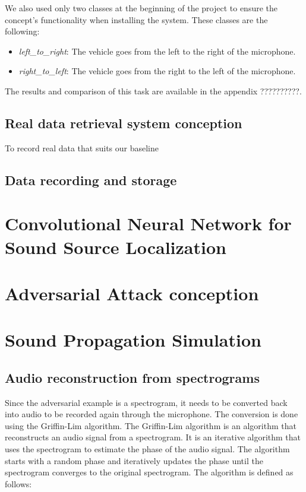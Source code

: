 We also used only two classes at the beginning of the project to ensure the concept's functionality when installing the system. These classes are the following:

\begin{itemize}
    \item  \textit{left\_to\_right}:  The vehicle goes from the left to the right of the microphone.
    \item  \textit{right\_to\_left}:  The vehicle goes from the right to the left of the microphone.
\end{itemize}

The results and comparison of this task are available in the appendix ??????????.

\subsection{Real data retrieval system conception}

To record real data that suits our baseline 

\subsection{Data recording and storage}

\section{Convolutional Neural Network for Sound Source Localization}

\section{Adversarial Attack conception}

\section{Sound Propagation Simulation}





\subsection{Audio reconstruction from spectrograms}

Since the adversarial example is a spectrogram, it needs to be converted back into audio to be recorded again through the microphone. The conversion is done using the Griffin-Lim algorithm\cite{griffin1984signal}. The Griffin-Lim algorithm is an algorithm that reconstructs an audio signal from a spectrogram. It is an iterative algorithm that uses the spectrogram to estimate the phase of the audio signal. The algorithm starts with a random phase and iteratively updates the phase until the spectrogram converges to the original spectrogram. The algorithm is defined as follows: